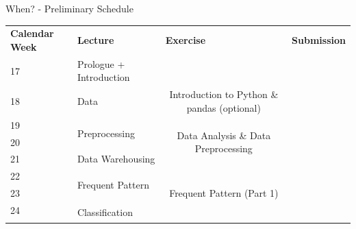 \begin{frame}{When? - Preliminary Schedule}
	\footnotesize
	\centering
	\begin{tabular}{|p{4em}|p{15em}|p{9.5em}|p{9.5em}|p{10em}|}
		\hline
		\rowcolor{faugray!62}\textbf{Calendar Week} & \textbf{Lecture}                  & \multicolumn{2}{|l|}{\textbf{Exercise}}                                         & \textbf{Submission}                                \\ \hhline{*{5}{:=}:}
		\cellcolor{faugray!25}17                    & Prologue + Introduction           & \multicolumn{2}{|l|}{\cellcolor{gray!50}}                                       & \cellcolor{gray!50}                                \\ \hhline{|-|-|--|-|}
		\cellcolor{faugray!25}18                    & Data                              & \multicolumn{2}{|c|}{Introduction to Python \& pandas {\color{gray}(optional)}} & \cellcolor{gray!50}                                \\ \hhline{|-|-|--|-|}
		\cellcolor{faugray!25}19                    & \multirow{2}{*}{Preprocessing}    & \multicolumn{2}{|c|}{\multirow{3}{*}{Data Analysis \& Data Preprocessing}}      & \cellcolor{gray!50}                                \\ \hhline{|-|~|~~|-|}
		\cellcolor{faugray!25}20                    &                                   & \multicolumn{2}{|l|}{}                                                          & \cellcolor{gray!50}                                \\ \hhline{|-|-|~~|-|}
		\cellcolor{faugray!25}21                    & Data Warehousing                  & \multicolumn{2}{|l|}{}                                                          & \cellcolor{gray!50}                                \\ \hhline{|-|-|--|-|}
		\cellcolor{faugray!25}22                    & \multirow{2}{*}{Frequent Pattern} & \multicolumn{2}{|c|}{\cellcolor{gray!50}}                                       & \cellcolor{gray!50}                                \\ \hhline{|-|~|--|-|}
		\cellcolor{faugray!25}23                    &                                   & \multicolumn{2}{|c|}{Frequent Pattern {\color{gray}(Part 1)}}                   & \cellcolor{gray!50}                                \\ \hhline{|-|-|--|-|}
		\cellcolor{faugray!25}24                    & \multirow{2}{*}{Classification}   & \multicolumn{2}{|l|}{\cellcolor{gray!50}}                                       & \cellcolor{gray!50}                                \\ \hhline{|-|~|~~|-|}

\end{tabular}
\end{frame}
